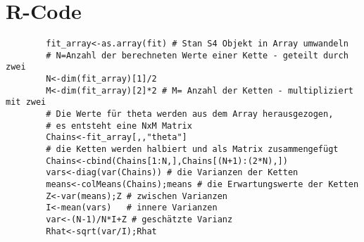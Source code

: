 
	\chapter{R-Code}		
	\begin{Code_kurz} \textcolor{white}{ }\vspace*{-0.5cm}\label{Code:Rhat}
		\begin{verbatim}
		fit_array<-as.array(fit) # Stan S4 Objekt in Array umwandeln
		# N=Anzahl der berechneten Werte einer Kette - geteilt durch zwei
		N<-dim(fit_array)[1]/2 
		M<-dim(fit_array)[2]*2 # M= Anzahl der Ketten - multipliziert mit zwei
		# Die Werte für theta werden aus dem Array herausgezogen,
		# es entsteht eine NxM Matrix
		Chains<-fit_array[,,"theta"]
		# die Ketten werden halbiert und als Matrix zusammengefügt
		Chains<-cbind(Chains[1:N,],Chains[(N+1):(2*N),]) 
		vars<-diag(var(Chains)) # die Varianzen der Ketten
		means<-colMeans(Chains);means # die Erwartungswerte der Ketten
		Z<-var(means);Z # zwischen Varianzen
		I<-mean(vars)   # innere Varianzen
		var<-(N-1)/N*I+Z # geschätzte Varianz
		Rhat<-sqrt(var/I);Rhat 
		\end{verbatim}
	\end{Code_kurz}